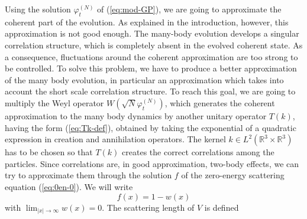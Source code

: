 \documentclass[11pt,a4paper,DIV11]{scrartcl}	%
\newcommand{\bR}{{\mathbb R}}
\begin{document}
\medskip

Using the solution $\varphi_t^{(N)}$ of (\ref{eq:mod-GP}), we are going to approximate the coherent part of the evolution. As explained in the introduction, however, this approximation is not good enough. The many-body evolution develops a singular correlation structure, which is completely absent in the evolved coherent state. As a consequence, fluctuations around the coherent approximation are too strong to be controlled. To solve this problem, we have to produce a better approximation of the many body evolution, in particular an approximation which takes into account the short scale correlation structure. To reach this goal, we are going to multiply the Weyl operator $W(\sqrt{N} \varphi_t^{(N)})$, which generates the coherent approximation to the many body dynamics by another unitary operator $T(k)$, having the form (\ref{eq:Tk-def}), obtained by taking the exponential of a quadratic expression in creation and annihilation operators. The kernel $k \in L^2 (\bR^3 \times \bR^3)$ has to be chosen so that $T(k)$ creates the correct correlations among the particles. Since correlations are, in good approximation, two-body effects, we can try to approximate them through the solution $f$ of the zero-energy scattering equation (\ref{eq:0en-0}). We will write 
%
\begin{equation}\label{eq:wdef}
  f (x) = 1 - w (x)
\end{equation}
with $\lim_{|x|\to\infty} w(x) = 0$. The scattering length of $V$ is defined
\end{document}
